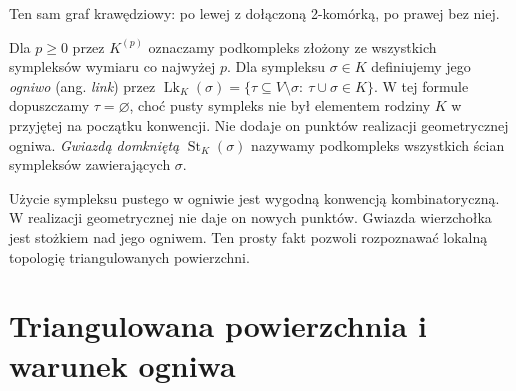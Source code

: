 \begin{samepage}
\begin{center}
\begin{minipage}{.96\linewidth}\centering
{}\par\smallskip

{\footnotesize Ten sam graf krawędziowy: po lewej z dołączoną
2-komórką, po prawej bez niej.}
\end{minipage}
\end{center}
\end{samepage}

\begin{definicja}
Dla $p\ge0$ przez $K^{(p)}$ oznaczamy podkompleks
złożony ze wszystkich sympleksów wymiaru co najwyżej $p$.
Dla sympleksu $\sigma\in K$ definiujemy jego
\emph{ogniwo} (ang. \emph{link}) przez
$\operatorname{Lk}_K(\sigma)
=\{\tau\subseteq V\setminus\sigma:
\ \tau\cup\sigma\in K\}$.
W tej formule dopuszczamy $\tau=\varnothing$, choć
pusty sympleks nie był elementem rodziny $K$ w przyjętej
na początku konwencji. Nie dodaje on punktów
realizacji geometrycznej ogniwa. \emph{Gwiazdą domkniętą}
$\operatorname{St}_K(\sigma)$ nazywamy podkompleks
wszystkich ścian sympleksów zawierających $\sigma$.
\end{definicja}

Użycie sympleksu pustego w ogniwie jest wygodną konwencją
kombinatoryczną. W realizacji geometrycznej nie daje on
nowych punktów. Gwiazda wierzchołka jest stożkiem nad
jego ogniwem. Ten prosty fakt pozwoli rozpoznawać lokalną
topologię triangulowanych powierzchni.

\section{Triangulowana powierzchnia i warunek ogniwa}
\label{sec:tg-link-manifold}

